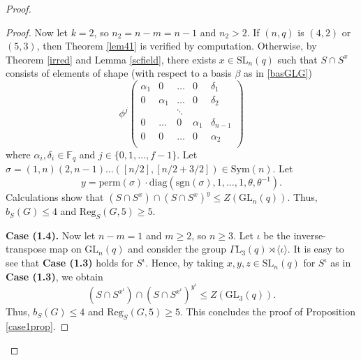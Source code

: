 \documentclass[a4paper,reqno,11pt]{amsart}
\theoremstyle{definition}
\theoremstyle{remark}
\numberwithin{equation}{section}
\newcommand{\Sym}{\mathrm{Sym}}
\newcommand{\diag}{\mathrm{diag}}
\newcommand{\sgn}{\mathrm{sgn}}
\newcommand{\per}{\mathrm{perm}}
\newcommand{\Reg}{\mathrm{Reg}}
\newcommand{\GaL}{{\Gamma \mathrm{L}}}
\newcommand{\SL}{{\mathrm{SL}}}
\newcommand{\GL}{{\mathrm{GL}}}
\begin{document}
\begin{proof}
\begin{proof}
Now let $k=2$, so $n_2=n-m=n-1$ and $n_2>2$. If $(n,q)$ is $(4,2)$ or $(5,3)$, then Theorem \ref{lem41} is verified by  computation.  Otherwise,  by Theorem \ref{irred} and Lemma \ref{scfield},
there exists $x \in \SL_n(q)$ such that $S \cap S^x$ consists of elements of  shape (with respect to a basis $\beta$ as in \eqref{basGLG})
\begin{equation*} 
\phi^j
  \begin{pmatrix}
\alpha_1 &0 & \dots    & 0 & \delta_1  \\
0 & \alpha_1 & \dots  & 0 & \delta_2 \\
 &  & \ddots  &  &  \\
 0& \dots & 0  & \alpha_{1} & \delta_{n-1} \\
0 & 0 & \dots  & 0 & \alpha_2 \\
\end{pmatrix}
\end{equation*}
where $\alpha_i, \delta_i \in \mathbb{F}_q$ and $j \in \{0,1, \ldots, f-1\}.$
Let $\sigma =(1, n)(2, n - 1) \ldots ([n/2], [n/2 + 3/2]) \in \Sym(n).$ Let $$y = \per(\sigma) \cdot \diag(\sgn(\sigma), 1, \ldots, 1, \theta, \theta^{-1}).$$ Calculations show that $(S \cap S^x) \cap (S \cap S^x)^y \le Z(\GL_n(q)).$
Thus, $b_S(G)\le 4$ and $\Reg_{S}(G,5) \ge 5.$
 

\medskip

{\bf Case (1.4).} Now let $n-m=1$  and $m \ge 2$,  so $n\ge 3.$   Let $\iota$ be the inverse-transpose map on $\GL_n(q)$ and  consider the group $\GaL_3(q) \rtimes \langle \iota \rangle$. It is easy to see that {\bf Case (1.3)} holds for $S^{\iota}$. Hence, by taking $x,y,z \in \SL_n(q)$ for $S^{\iota}$  as in {\bf Case (1.3)}, we obtain
$$(S\cap S^{x^{\iota}}) \cap (S\cap S^{x^{\iota}})^{y^{\iota}} \le Z(\GL_3(q)).$$ Thus, $b_S(G)\le 4$ and $\Reg_{S}(G,5) \ge 5.$ This concludes the proof of Proposition \ref{case1prop}.
\end{proof}


\end{proof}
\end{document}
